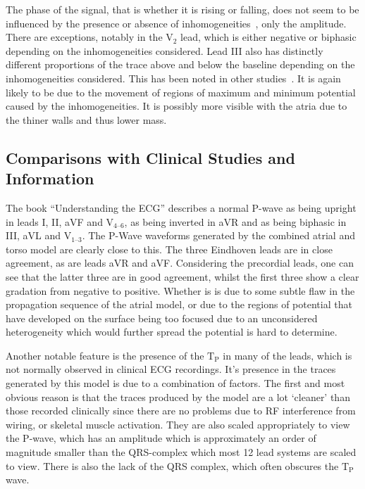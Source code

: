 The phase of the signal, that is whether it is rising or falling, does not seem
to be influenced by the presence or absence of
inhomogeneities~\cite{Rudy2006,Gulrajani1983}, only the amplitude.
There are exceptions, notably in the $\text{V}_{\text{2}}$ lead, which is either
negative or biphasic depending on the inhomogeneities considered.
Lead III also has distinctly different proportions of the trace above and below
the baseline depending on the inhomogeneities considered.
This has been noted in other studies~\cite{vanDam2005}.
It is again likely to be due to the movement of regions of maximum and minimum
potential caused by the inhomogeneities.
It is possibly more visible with the atria due to the thiner walls and thus
lower mass.

\subsection{Comparisons with Clinical Studies and Information}

The book ``Understanding the ECG'' describes a normal P-wave as being upright in
leads I, II, aVF and $\text{V}_{\text{4--6}}$, as being inverted in aVR and as
being biphasic in III, aVL and $\text{V}_{\text{1--3}}$.
The P-Wave waveforms generated by the combined atrial and torso model are
clearly close to this.
The three Eindhoven leads are in close agreement, as are leads aVR and aVF.
Considering the precordial leads, one can see that the latter three are in good
agreement, whilst the first three show a clear gradation from negative to
positive.
Whether is is due to some subtle flaw in the propagation sequence of the atrial
model, or due to the regions of potential that have developed on the surface
being too focused due to an unconsidered heterogeneity which would further
spread the potential is hard to determine.

Another notable feature is the presence of the $\text{T}_{\text{P}}$ in many of
the leads, which is not normally observed in clinical ECG recordings.
It's presence in the traces generated by this model is due to a combination of
factors.
The first and most obvious reason is that the traces produced by the model are a
lot `cleaner' than those recorded clinically since there are no problems due to
RF interference from wiring, or skeletal muscle activation.
They are also scaled appropriately to view the P-wave, which has an
amplitude which is approximately an order of magnitude smaller than the
QRS-complex which most 12 lead systems are scaled to view.
There is also the lack of the QRS complex, which often obscures the
$\text{T}_{\text{P}}$ wave.

